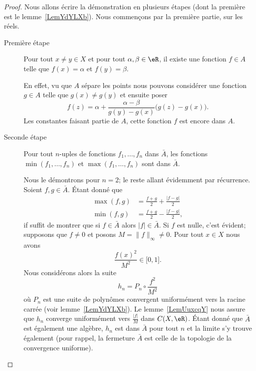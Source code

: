 \begin{proof}
    Nous allons écrire la démonstration en plusieurs étapes (dont la première est le lemme~\ref{LemYdYLXb}). Nous commençons par la première partie, sur les réels.

    \begin{description}
        \item[Première étape] Pour tout \( x\neq y\in X\) et pour tout \( \alpha,\beta\in \eR\), il existe une fonction \( f\in A\) telle que \( f(x)=\alpha\) et \( f(y)=\beta\).

            En effet, vu que \( A\) sépare les points nous pouvons considérer une fonction \( g\in A\) telle que \( g(x)\neq g(y)\) et ensuite poser
            \begin{equation}
                f(z)=\alpha+\frac{ \alpha-\beta }{ g(y)-g(x) }\big( g(z)-g(x) \big).
            \end{equation}
            Les constantes faisant partie de \( A\), cette fonction \( f\) est encore dans \( A\).

        \item[Seconde étape] Pour tout \( n\)-uples de fonctions \( f_1,\ldots, f_n\) dans \( \bar A\), les fonctions \( \min(f_1,\ldots, f_n)\) et \( \max(f_1,\ldots, f_n)\) sont dans \( \bar A\).

            Nous le démontrons pour \( n=2\); le reste allant évidemment par récurrence. Soient \( f,g\in \bar A\). Étant donné que
            \begin{subequations}
                \begin{align}
                    \max(f,g)&=\frac{ f+g }{2}+\frac{ | f-g | }{2}\\
                    \min(f,g)&=\frac{ f+g }{2}-\frac{ | f-g | }{2},
                \end{align}
            \end{subequations}
            if suffit de montrer que si \( f\in\bar A\) alors \( | f |\in \bar A\). Si \( f\) est nulle, c'est évident; supposons que \( f\neq 0\) et posons \( M=\| f \|_{\infty}\neq 0\). Pour tout \( x\in X\) nous avons
            \begin{equation}
                \frac{ f(x)^2 }{ M^2 }\in \mathopen[ 0 , 1 \mathclose].
            \end{equation}
            Nous considérons alors la suite
            \begin{equation}
                h_n=P_n\circ\frac{ f^2 }{ M^2 }
            \end{equation}
            où \( P_n\) est une suite de polynômes convergent uniformément vers la racine carrée (voir lemme~\ref{LemYdYLXb}). Le lemme~\ref{LemUuxcqY} nous assure que \( h_n\) converge uniformément vers \( \frac{ | f | }{ M }\) dans \( C(X,\eR)\). Étant donné que \( \bar A\) est également une algèbre, \( h_n\) est dans \( \bar A\) pour tout \( n\) et la limite s'y trouve également (pour rappel, la fermeture \( \bar A\) est celle de la topologie de la convergence uniforme).


\end{description}
\end{proof}
